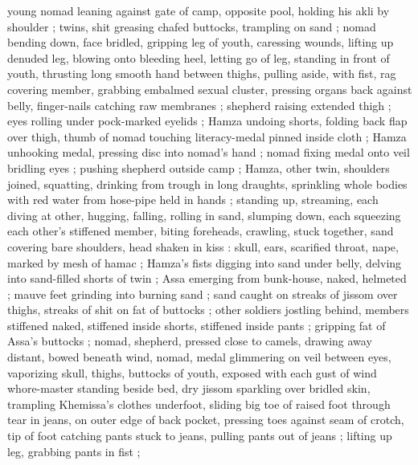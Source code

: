 young nomad leaning against gate of camp, opposite pool, holding his akli by shoulder ; twins, shit greasing chafed buttocks, trampling on sand ; nomad bending down, face bridled, gripping leg of youth, caressing wounds, lifting up denuded leg, blowing onto bleeding heel, letting go of leg, standing in front of youth, thrusting long smooth hand between thighs, pulling aside, with fist, rag covering member, grabbing embalmed sexual cluster, pressing organs back against belly, finger-nails catching raw membranes ; shepherd raising extended thigh ; eyes rolling under pock-marked eyelids ; Hamza undoing shorts, folding back flap over thigh, thumb of nomad touching literacy-medal pinned inside cloth ; Hamza unhooking medal, pressing disc into nomad's hand ; nomad fixing medal onto veil bridling eyes ; pushing shepherd outside camp ; Hamza, other twin, shoulders joined, squatting, drinking from trough in long draughts, sprinkling whole bodies with red water from hose-pipe held in hands ; standing up, streaming, each diving at other, hugging, falling, rolling in sand, slumping down, each squeezing each other's stiffened member, biting foreheads, crawling, stuck together, sand covering bare shoulders, head shaken in kiss : skull, ears, scarified throat, nape, marked by mesh of hamac ; Hamza's fists digging into sand under belly, delving into sand-filled shorts of twin ; Assa emerging from bunk-house, naked, helmeted ; mauve feet grinding into burning sand ; sand caught on streaks of jissom over thighs, streaks of shit on fat of buttocks ; other soldiers jostling behind, members stiffened naked, stiffened inside shorts, stiffened inside pants ; gripping fat of Assa's buttocks ; nomad, shepherd, pressed close to camels, drawing away distant, bowed beneath wind, nomad, medal glimmering on veil between eyes, vaporizing skull, thighs, buttocks of youth, exposed with each gust of wind {\twoslash} whore-master standing beside bed, dry jissom sparkling over bridled skin, trampling Khemissa's clothes underfoot, sliding big toe of raised foot through tear in jeans, on outer edge of back pocket, pressing toes against seam of crotch, tip of foot catching pants stuck to jeans, pulling pants out of jeans ; lifting up leg, grabbing pants in fist ; 
